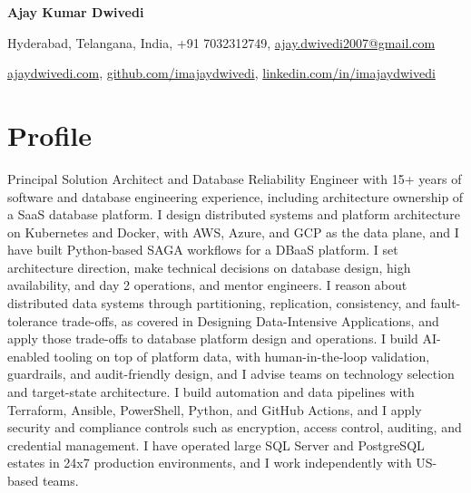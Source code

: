\documentclass[10pt,a4paper]{article}
\begin{document}
\begin{center}
{\Huge\bfseries Ajay Kumar Dwivedi}

\vspace{6pt}
Hyderabad, Telangana, India, +91 7032312749, \href{mailto:ajay.dwivedi2007@gmail.com}{ajay.dwivedi2007@gmail.com}

\vspace{2pt}
\href{https://ajaydwivedi.com/}{ajaydwivedi.com}, \href{https://github.com/imajaydwivedi}{github.com/imajaydwivedi}, \href{https://linkedin.com/in/imajaydwivedi/}{linkedin.com/in/imajaydwivedi}
\end{center}

\section{Profile}
Principal Solution Architect and Database Reliability Engineer with 15+ years of software and database engineering experience, including architecture ownership of a SaaS database platform. I design distributed systems and platform architecture on Kubernetes and Docker, with AWS, Azure, and GCP as the data plane, and I have built Python-based SAGA workflows for a DBaaS platform. I set architecture direction, make technical decisions on database design, high availability, and day 2 operations, and mentor engineers. I reason about distributed data systems through partitioning, replication, consistency, and fault-tolerance trade-offs, as covered in Designing Data-Intensive Applications, and apply those trade-offs to database platform design and operations. I build AI-enabled tooling on top of platform data, with human-in-the-loop validation, guardrails, and audit-friendly design, and I advise teams on technology selection and target-state architecture. I build automation and data pipelines with Terraform, Ansible, PowerShell, Python, and GitHub Actions, and I apply security and compliance controls such as encryption, access control, auditing, and credential management. I have operated large SQL Server and PostgreSQL estates in 24x7 production environments, and I work independently with US-based teams.
\end{document}
